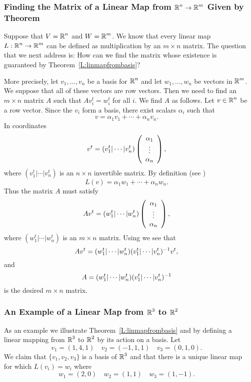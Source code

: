 \documentclass{ximera}
\begin{document}
\subsubsection*{Finding the Matrix of a Linear Map from $\mbox{$\Bbb{R}$}^n\to\mbox{$\Bbb{R}$}^m$
Given by Theorem~\protect{\ref{L:linmapfrombasis}}}

Suppose that $V=\mbox{$\Bbb{R}$}^n$ and $W=\mbox{$\Bbb{R}$}^m$.  We know that every linear
map $L:\mbox{$\Bbb{R}$}^n\to\mbox{$\Bbb{R}$}^m$ can be defined as multiplication by an
$m\times n$ matrix.  The question that we next address is:
How can we find the matrix whose existence is guaranteed by
Theorem~\ref{L:linmapfrombasis}?

More precisely, let $v_1,\ldots,v_n$ be a basis for $\mbox{$\Bbb{R}$}^n$ and
let $w_1,\ldots,w_n$ be vectors in $\mbox{$\Bbb{R}$}^m$.  We suppose that all
of these vectors are row vectors.  Then we need to find
an $m\times n$ matrix $A$ such that $Av_i^t=w_i^t$ for all $i$.
We find $A$ as follows.  Let $v\in\mbox{$\Bbb{R}$}^n$ be a row vector.  Since
the $v_i$ form a basis, there exist scalars $\alpha_i$ such that
\[
v=\alpha_1 v_1 + \cdots + \alpha_n v_n.
\]
In coordinates
\begin{equation}  \label{e:v^t}
v^t = (v_1^t|\cdots|v_n^t)\left(\begin{array}{c} \alpha_1 \\ \vdots \\ \alpha_{n}\end{array}\right),
\end{equation}
where $(v_1^t|\cdots|v_n^t)$ is an $n\times n$
invertible matrix.
By definition (see )
\[
L(v) = \alpha_1 w_1 + \cdots + \alpha_n w_n.
\]
Thus the matrix $A$ must satisfy
\[
Av^t = (w_1^t|\cdots|w_n^t)\left(\begin{array}{c} \alpha_1 \\ \vdots \\ \alpha_{n}\end{array}\right),
\]
where $(w_1^t|\cdots|w_n^t)$ is an $m\times n$ matrix.
Using  we see that
\[
Av^t = (w_1^t|\cdots|w_n^t)(v_1^t|\cdots|v_n^t)^{-1} v^t,
\]
and
\begin{equation}  \label{e:defA}
A = (w_1^t|\cdots|w_n^t)(v_1^t|\cdots|v_n^t)^{-1}
\end{equation}
is the desired $m\times n$ matrix.

\subsubsection*{An Example of a Linear Map from $\mbox{$\Bbb{R}$}^3$ to $\mbox{$\Bbb{R}$}^2$}

As an example we illustrate Theorem~\ref{L:linmapfrombasis} and
 by defining a linear mapping from $\mbox{$\Bbb{R}$}^3$ to $\mbox{$\Bbb{R}$}^2$
by its action on a basis.  Let
\[
v_1=(1,4,1)\quad v_2=(-1,1,1) \quad v_3=(0,1,0).
\]
We claim that $\{v_1,v_2,v_3\}$ is a basis of $\mbox{$\Bbb{R}$}^3$ and that
there is a unique linear map for which $L(v_i)=w_i$ where
\[
w_1=(2,0) \quad w_2=(1,1) \quad w_3=(1,-1).
\]
\end{document}
